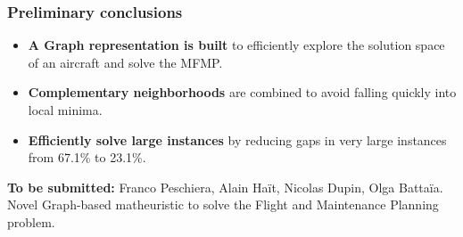 \begin{frame}[t]
\frametitle{\textbf{Preliminary conclusions}}
  \pause
    \begin{itemize}[<+->]
    \item \textbf{A Graph representation is built} 
      to efficiently explore the solution space of an aircraft and solve the MFMP.
    \item \textbf{Complementary neighborhoods} 
      are combined to avoid falling quickly into local minima.
    \item \textbf{Efficiently solve large instances} 
      by reducing gaps in very large instances from 67.1\% to 23.1\%.
    \end{itemize}
  \pause
  \textbf{To be submitted:} Franco Peschiera, Alain Haït, Nicolas Dupin, Olga Battaïa. Novel Graph-based matheuristic to solve the Flight and Maintenance Planning problem.
\end{frame}


